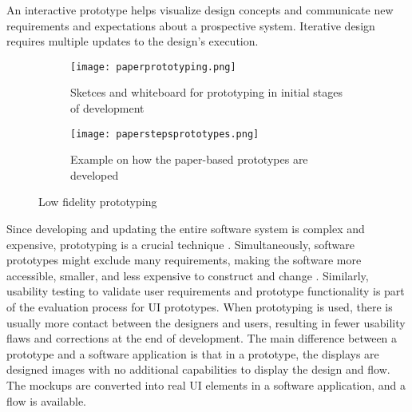 An interactive prototype helps visualize design concepts and communicate new requirements and expectations about a prospective system.
Iterative design requires multiple updates to the design's execution.
\begin{figure}[htbp!]
  \centering
  \begin{subfigure}[b]{0.6\textwidth}
    \texttt{[image: paperprototyping.png]}
    \caption{Sketces and whiteboard for prototyping in initial stages of development}
    \label{fig:background:paperPrototyping}   
  \end{subfigure}             
  \begin{subfigure}[b]{0.5\textwidth}
    \texttt{[image: paperstepsprototypes.png]}
    \caption[Paper based prototypes]{Example on how the paper-based prototypes are developed  \cite{misc:prototyping:uxpin}}
    \label{fig:background:paperprototypes}
  \end{subfigure}             
  \caption[Low fidelity prototyping]{Low fidelity prototyping}
  \label{fig:background:main}
\end{figure}
Since developing and updating the entire software system is complex and expensive, prototyping is a crucial technique \cite{article:prototyping:szekely}.
Simultaneously, software prototypes might exclude many requirements, making the software more accessible, smaller, and less expensive to construct and change \cite{article:prototyping:szekely}. 
Similarly, usability testing to validate user requirements and prototype functionality is part of the evaluation process for UI prototypes.
When prototyping is used, there is usually more contact between the designers and users, resulting in fewer usability flaws and corrections at the end of development.
The main difference between a prototype and a software application is that in a prototype, the displays are designed images with no additional capabilities to display the design and flow. The mockups are converted into real UI elements in a software application, and a flow is available.

